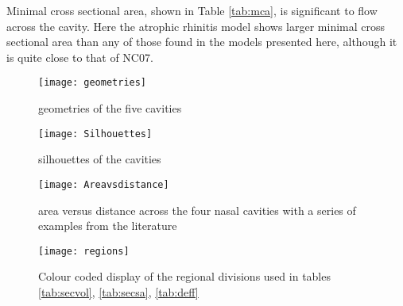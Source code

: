 Minimal cross sectional area, shown in Table \ref{tab:mca}, is significant to flow across the cavity\cite{Lindemann2008}. Here the atrophic rhinitis model shows larger minimal cross sectional area than any of those found in the models presented here, although it is quite close to that of NC07.


\begin{figure} \label{fig:geo}
  \texttt{[image: geometries]}
  \caption{geometries of the five cavities}
\end{figure}

\begin{figure} 
  \texttt{[image: Silhouettes]}
  \caption{silhouettes of the cavities}
  \label{fig:sil}

\end{figure}

\begin{figure}
  \texttt{[image: Areavsdistance]}
  \caption{area versus distance across the four nasal cavities with a series of examples from the literature}
  \label{fig:area}
\end{figure}

\begin{figure}
\centering
\texttt{[image: regions]}
\caption{Colour coded display of the regional divisions used in tables \ref{tab:secvol}, \ref{tab:secsa}, \ref{tab:deff}} 
\label{fig:regions}
\end{figure}

